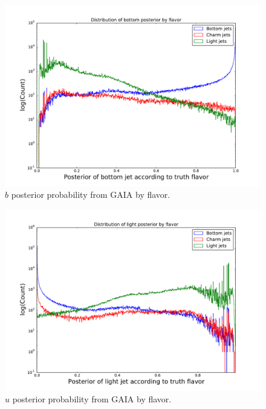 \begin{figure}[h]
\includegraphics[width=\textwidth]{figures/unweight_bottom_p_distro}
\caption[The ATLAS detector]{$b$ posterior probability from GAIA by flavor.
\label{fig:bpost}}
\end{figure}

\begin{figure}[h]
\includegraphics[width=\textwidth]{figures/light_p_distro}
\caption[The ATLAS detector]{$u$ posterior probability from GAIA by flavor.
\label{fig:upost}}
\end{figure}

